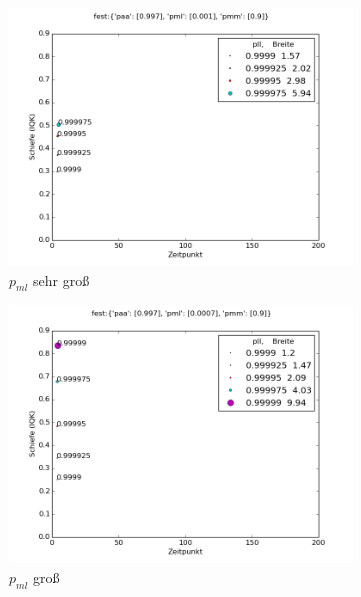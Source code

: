 \begin{figure}
\begin{subfigure}[t]{0.49\textwidth}
\includegraphics[width=\textwidth]{bilder/pll/3fest_09_0001_0997_p}
\caption{$p_{ml}$ sehr groß}
\label{einfluss_pll_pml++}
\end{subfigure}
\begin{subfigure}[t]{0.49\textwidth}
\includegraphics[width=\textwidth]{bilder/pll/3fest_09_00007_0997_p}
\caption{$p_{ml}$ groß}
\label{einfluss_pll_pml+}
\end{subfigure}
\vspace*{7mm}
\begin{subfigure}[b]{0.49\textwidth}

\end{subfigure}
\end{figure}
